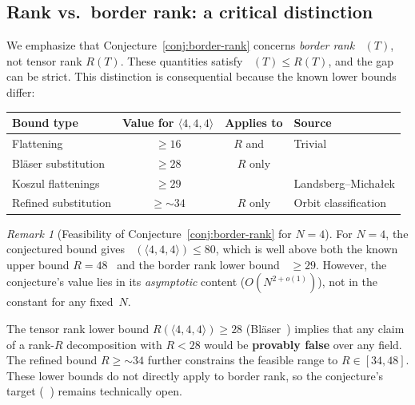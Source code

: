 \documentclass[11pt,a4paper]{article}
\theoremstyle{definition}
\theoremstyle{remark}
\newtheorem{remark}[theorem]{Remark}
\DeclareMathOperator{\brank}{\underline{R}}
\newcommand{\mmtensor}[3]{\langle #1, #2, #3 \rangle}
\begin{document}
\subsection{Rank vs.\ border rank: a critical distinction}
\label{sec:rank-vs-border}


We emphasize that Conjecture~\ref{conj:border-rank} concerns
\emph{border rank} $\brank(T)$, not tensor rank $R(T)$. These
quantities satisfy $\brank(T) \le R(T)$, and the gap can be strict.
This distinction is consequential because the known lower bounds
differ:

\begin{center}
\begin{tabular}{l|c|c|l}
\textbf{Bound type} & \textbf{Value for $\mmtensor{4}{4}{4}$}
  & \textbf{Applies to} & \textbf{Source} \\ \hline
Flattening & $\ge 16$ & $R$ and $\brank$ & Trivial \\
Bl\"aser substitution & $\ge 28$ & $R$ only & \cite{Blaser2003} \\
Koszul flattenings & $\ge 29$ & $\brank$ & Landsberg--Micha{\l}ek \\
Refined substitution & $\ge \mathord{\sim}34$ & $R$ only
  & Orbit classification \\
\end{tabular}
\end{center}

\begin{remark}[Feasibility of Conjecture~\ref{conj:border-rank}
for $N = 4$]\label{rem:feasibility}
For $N = 4$, the conjectured bound gives
$\brank(\mmtensor{4}{4}{4}) \le 80$, which is well above both the
known upper bound $R = 48$~\cite{AlphaEvolve2025} and the border rank
lower bound $\brank \ge 29$. However, the conjecture's value lies in
its \emph{asymptotic} content ($O(N^{2+o(1)})$), not in the constant
for any fixed~$N$.

The tensor rank lower bound $R(\mmtensor{4}{4}{4}) \ge 28$
(Bl\"aser~\cite{Blaser2003}) implies that any claim of a rank-$R$
decomposition with $R < 28$ would be \textbf{provably false} over
any field. The refined bound $R \ge \mathord{\sim}34$ further
constrains the feasible range to $R \in [34, 48]$.
These lower bounds do not directly apply to border rank, so the
conjecture's target ($\brank$) remains technically open.
\end{remark}
\end{document}
